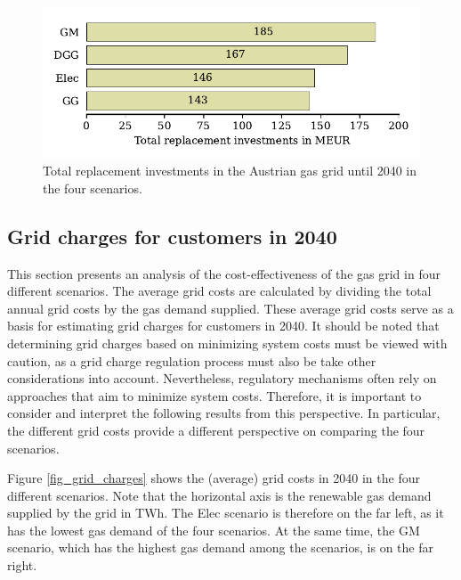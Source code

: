\begin{figure}[h]
	\centering
	\includegraphics[width=0.8\linewidth]{figures/results/total_replacement_inv/replace_inv_2040.pdf}
	\caption{Total replacement investments in the Austrian gas grid until 2040 in the four scenarios.}
	\label{fig_grid_repl_inv}
\end{figure}

\subsection{Grid charges for customers in 2040}\label{res_grid_charges}
This section presents an analysis of the cost-effectiveness of the gas grid in four different scenarios. The average grid costs are calculated by dividing the total annual grid costs by the gas demand supplied. These average grid costs serve as a basis for estimating grid charges for customers in 2040. It should be noted that determining grid charges based on minimizing system costs must be viewed with caution, as a grid charge regulation process must also be take other considerations into account. Nevertheless, regulatory mechanisms often rely on approaches that aim to minimize system costs. Therefore, it is important to consider and interpret the following results from this perspective. In particular, the different grid costs provide a different perspective on comparing the four scenarios.\vspace{0.3cm}

Figure \ref{fig_grid_charges} shows the (average) grid costs in 2040 in the four different scenarios. Note that the horizontal axis is the renewable gas demand supplied by the grid in TWh. The Elec scenario is therefore on the far left, as it has the lowest gas demand of the four scenarios. At the same time, the GM scenario, which has the highest gas demand among the scenarios, is on the far right. 

